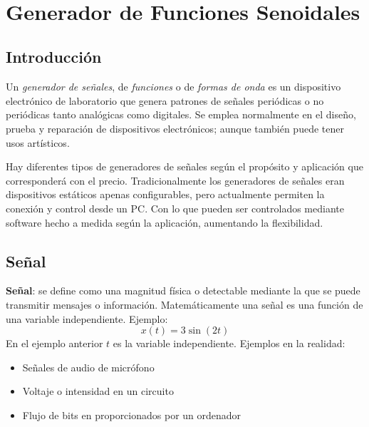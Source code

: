 \documentclass[11pt]{article}
\makeatletter
\let\thedate\@date
\makeatother
\begin{document}
\begin{titlepage}
	{\large \thedate}\\[2 cm]
 
	\vfill
	
\end{titlepage}


\tableofcontents
\pagebreak


\section{Generador de Funciones Senoidales}
\subsection{Introducción}

Un \emph{generador de señales}, de \emph{funciones} o de \emph{formas de onda} es un dispositivo electrónico de laboratorio que genera patrones de señales periódicas o no periódicas tanto analógicas como digitales. Se emplea normalmente en el diseño, prueba y reparación de dispositivos electrónicos; aunque también puede tener usos artísticos.

Hay diferentes tipos de generadores de señales según el propósito y aplicación que corresponderá con el precio. Tradicionalmente los generadores de señales eran dispositivos estáticos apenas configurables, pero actualmente permiten la conexión y control desde un PC. Con lo que pueden ser controlados mediante software hecho a medida según la aplicación, aumentando la flexibilidad. \citep{gdf}

\subsection{Señal}
\textbf{Señal}: se define como una magnitud física o detectable mediante la que se puede transmitir mensajes o información. Matemáticamente una señal es una función de una variable independiente. Ejemplo: 
$$x(t) = 3\sin(2t)$$
En el ejemplo anterior $t$ es la variable independiente.
Ejemplos en la realidad:
\begin{itemize}
\item Señales de audio de micrófono
\item Voltaje o intensidad en un circuito
\item Flujo de bits en proporcionados por un ordenador \citep{iss}
\end{itemize}
\end{document}
